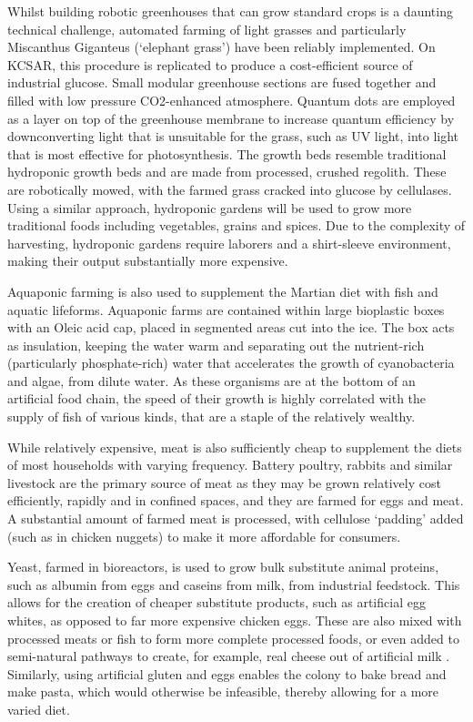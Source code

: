 \documentclass[fleqn,10pt]{Stylesheet} %
\begin{document}
Whilst building robotic greenhouses that can grow standard crops is a daunting technical challenge, automated farming of light grasses and particularly Miscanthus Giganteus (‘elephant grass’) have been reliably implemented. On KCSAR, this procedure is replicated to produce a cost-efficient source of industrial glucose. Small modular greenhouse sections are fused together and filled with low pressure CO2-enhanced atmosphere. Quantum dots are employed as a layer on top of the greenhouse membrane to increase quantum efficiency by downconverting light that is unsuitable for the grass, such as UV light, into light that is most effective for photosynthesis. The growth beds resemble traditional hydroponic growth beds and are made from processed, crushed regolith. These are robotically mowed, with the farmed grass cracked into glucose by cellulases. Using a similar approach, hydroponic gardens will be used to grow more traditional foods including vegetables, grains and spices. Due to the complexity of harvesting, hydroponic gardens require laborers and a shirt-sleeve environment, making their output substantially more expensive.

Aquaponic farming is also used to supplement the Martian diet with fish and aquatic lifeforms. Aquaponic farms are contained within large bioplastic boxes with an Oleic acid cap, placed in segmented areas cut into the ice. The box acts as insulation, keeping the water warm and separating out the nutrient-rich (particularly phosphate-rich) water that accelerates the growth of cyanobacteria and algae, from dilute water. As these organisms are at the bottom of an artificial food chain, the speed of their growth is highly correlated with the supply of fish of various kinds, that are a staple of the relatively wealthy. 

While relatively expensive, meat is also sufficiently cheap to supplement the diets of most households with varying frequency. Battery poultry, rabbits and similar livestock are the primary source of meat as they may be grown relatively cost efficiently, rapidly and in confined spaces, and they are farmed for eggs and meat. A substantial amount of farmed meat is processed, with cellulose ‘padding’ added (such as in chicken nuggets) to make it more affordable for consumers. 

Yeast, farmed in bioreactors, is used to grow bulk substitute animal proteins, such as albumin from eggs and caseins from milk, from industrial feedstock. This allows for the creation of cheaper substitute products, such as artificial egg whites, as opposed to far more expensive chicken eggs. These are also mixed with processed meats or fish to form more complete processed foods, or even added to semi-natural pathways to create, for example, real cheese out of artificial milk \cite{Pandya2017}. Similarly, using artificial gluten and eggs enables the colony to bake bread and make pasta, which would otherwise be infeasible, thereby allowing for a more varied diet.
\end{document}
